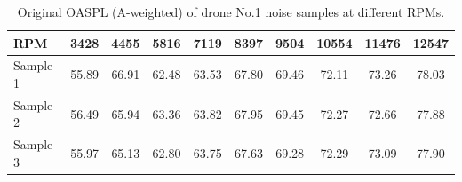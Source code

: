 \begin{table}[ht]
\caption{Original OASPL (A-weighted) of drone No.1 noise samples at different RPMs.}
\vskip3pt
\setlength{\tabcolsep}{6pt}
\begin{tabular}{l|ccccccccc}
\hline\hline
RPM & 3428 & 4455 & 5816 & 7119 & 8397 & 9504 & 10554 & 11476 & 12547 \\
\hline
Sample 1 & 55.89 & 66.91 & 62.48 & 63.53 & 67.80 & 69.46 & 72.11 & 73.26 & 78.03 \\
Sample 2 & 56.49 & 65.94 & 63.36 & 63.82 & 67.95 & 69.45 & 72.27 & 72.66 & 77.88 \\
Sample 3 & 55.97 & 65.13 & 62.80 & 63.75 & 67.63 & 69.28 & 72.29 & 73.09 & 77.90 \\
\hline\hline
\end{tabular}
\label{drone1OASPL}
\end{table}
